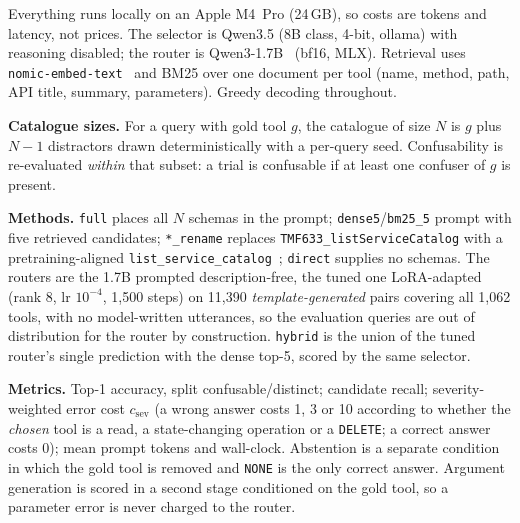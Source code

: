 Everything runs locally on an Apple M4~Pro (24\,GB), so costs are tokens and
latency, not prices. The selector is Qwen3.5 (8B class, 4-bit, ollama) with
reasoning disabled; the router is Qwen3-1.7B~\cite{qwen3} (bf16, MLX)\@.
Retrieval uses \texttt{nomic-embed-text}~\cite{nomic} and BM25 over one
document per tool (name, method, path, API title, summary, parameters).
Greedy decoding throughout.

\textbf{Catalogue sizes.} For a query with gold tool $g$, the catalogue of
size $N$ is $g$ plus $N-1$ distractors drawn deterministically with a per-query
seed. Confusability is re-evaluated \emph{within} that subset: a trial is
confusable if at least one confuser of $g$ is present.

\textbf{Methods.} \texttt{full} places all $N$ schemas in the prompt;
\texttt{dense5}/\texttt{bm25\_5} prompt with five retrieved candidates;
\texttt{*\_rename} replaces \texttt{TMF633\_\allowbreak listServiceCatalog} with a
pretraining-aligned \texttt{list\_service\_catalog}~\cite{patool};
\texttt{direct} supplies no schemas. The routers are the 1.7B prompted
description-free, the tuned one LoRA-adapted (rank 8, lr $10^{-4}$, 1,500
steps) on 11,390 \emph{template-generated} pairs covering all 1,062 tools, with no model-written utterances, so the evaluation queries are out of distribution
for the router by construction. \texttt{hybrid} is the union of the tuned
router's single prediction with the dense top-5, scored by the same selector.

\textbf{Metrics.} Top-1 accuracy, split confusable/distinct; candidate recall;
severity-weighted error cost $c_{\mathrm{sev}}$ (a wrong answer costs 1, 3 or
10 according to whether the \emph{chosen} tool is a read, a state-changing
operation or a \texttt{DELETE}; a correct answer costs 0); mean prompt tokens and wall-clock.
Abstention is a separate condition in which the gold tool is removed and
\texttt{NONE} is the only correct answer. Argument generation is scored in a
second stage conditioned on the gold tool, so a parameter error is never
charged to the router.
